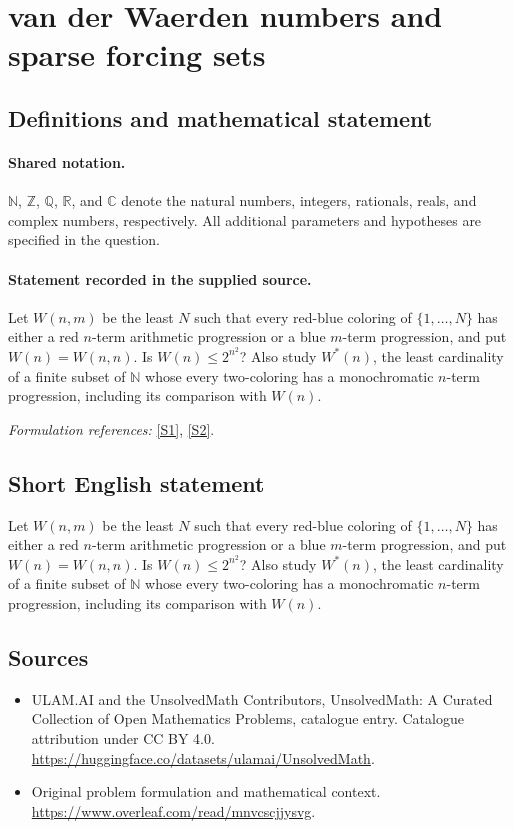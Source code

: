 \documentclass[11pt]{article}
\newcommand{\sref}[2]{\hyperlink{source:#1:#2}{[S#2]}}
\begin{document}
\section{van der Waerden numbers and sparse forcing sets}\label{statement}

\subsection{Definitions and mathematical statement}

\paragraph{Shared notation.}$\mathbb N$, $\mathbb Z$, $\mathbb Q$, $\mathbb R$, and $\mathbb C$ denote the natural numbers, integers, rationals, reals, and complex numbers, respectively. All additional parameters and hypotheses are specified in the question.


\paragraph{Statement recorded in the supplied source.}
Let $W(n,m)$ be the least $N$ such that every red-blue coloring of $\{1,\ldots,N\}$ has either a red $n$-term arithmetic progression or a blue $m$-term progression, and put $W(n)=W(n,n)$. Is $W(n)\leq2^{n^2}$? Also study $W^*(n)$, the least cardinality of a finite subset of $\mathbb N$ whose every two-coloring has a monochromatic $n$-term progression, including its comparison with $W(n)$.
\par\smallskip\textit{Formulation references:} \sref{statement}{1}, \sref{statement}{2}.
\subsection{Short English statement}
Let $W(n,m)$ be the least $N$ such that every red-blue coloring of $\{1,\ldots,N\}$ has either a red $n$-term arithmetic progression or a blue $m$-term progression, and put $W(n)=W(n,n)$. Is $W(n)\leq2^{n^2}$? Also study $W^*(n)$, the least cardinality of a finite subset of $\mathbb N$ whose every two-coloring has a monochromatic $n$-term progression, including its comparison with $W(n)$.
\subsection{Sources}
\begin{itemize}
\item[\hypertarget{source:statement:1}{S1}] ULAM.AI and the UnsolvedMath Contributors, UnsolvedMath: A Curated Collection of Open Mathematics Problems, catalogue entry. Catalogue attribution under CC BY 4.0.
\url{https://huggingface.co/datasets/ulamai/UnsolvedMath}.
\item[\hypertarget{source:statement:2}{S2}] Original problem formulation and mathematical context.
\url{https://www.overleaf.com/read/mnvcscjjysvg}.
\end{itemize}
\label{end:statement}
\end{document}
